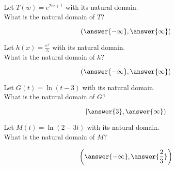 \documentclass{ximera}
\author{Lee Wayand}
\begin{document}
\begin{exercise}








\begin{question}


Let $T(w) = e^{2w+1}$ with its natural domain. \\

What is the natural domain of $T$?

\[
\left( \answer{-\infty},  \answer{\infty}  \right)
\]


\end{question}







\begin{question}


Let $h(x) = \frac{e^x}{5}$ with its natural domain. \\

What is the natural domain of $h$?

\[
\left( \answer{-\infty},  \answer{\infty}  \right)
\]


\end{question}








\begin{question}


Let $G(t) = \ln(t-3)$ with its natural domain. \\

What is the natural domain of $G$?

\[
\left[ \answer{3}, \answer{\infty}  \right)
\]


\end{question}








\begin{question}


Let $M(t) = \ln(2-3t)$ with its natural domain. \\

What is the natural domain of $M$?

\[
\left( \answer{-\infty}, \answer{\frac{2}{3}} \right)
\]


\end{question}













\end{exercise}
\end{document}
